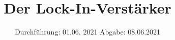 

\subject{V303}
\title{Der Lock-In-Verstärker}
\date{%
  Durchführung: 01.06. 2021
  \hspace{3em}
  Abgabe: 08.06.2021
}



\maketitle
\thispagestyle{empty}
\tableofcontents
\newpage






\printbibliography{}


